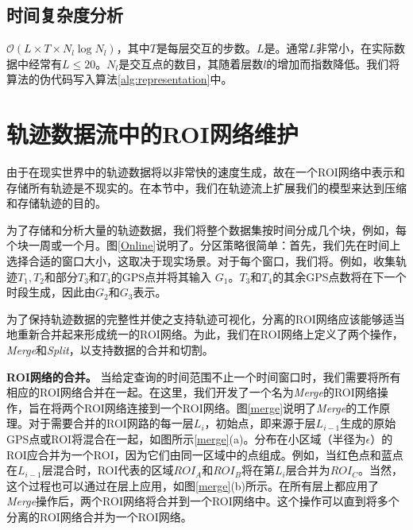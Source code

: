 \subsection{时间复杂度分析}
\label{time_complex}
$\mathcal{O}(L\times T\times N_l\log N_l)$，其中$T$是每层交互的步数。$L$是。通常$L$非常小，在实际数据中经常有$L\leq20$。$N_l$是交互点的数目，其随着层数$l$的增加而指数降低。我们将算法的伪代码写入算法\ref{alg:representation}中。

\section{轨迹数据流中的ROI网络维护}
由于在现实世界中的轨迹数据将以非常快的速度生成，故在一个ROI网络中表示和存储所有轨迹是不现实的。在本节中，我们在轨迹流上扩展我们的模型来达到压缩和存储轨迹的目的。


为了存储和分析大量的轨迹数据，我们将整个数据集按时间分成几个块，例如，每个块一周或一个月。图\ref{Online}说明了。分区策略很简单：首先，我们先在时间上选择合适的窗口大小，这取决于现实场景。对于每个窗口，我们将。例如，收集轨迹$T_1,T_2$和部分$T_3$和$T_4$的GPS点并将其输入 $G_1$。$T_3$和$T_4$的其余GPS点数将在下一个时段生成，因此由$G_2$和$G_3$表示。

为了保持轨迹数据的完整性并使之支持轨迹可视化，分离的ROI网络应该能够适当地重新合并起来形成统一的ROI网络。为此，我们在ROI网络上定义了两个操作，\emph{Merge}和\emph{Split}，以支持数据的合并和切割。


\vspace{3mm}
\noindent\textbf{ROI网络的合并。}
当给定查询的时间范围不止一个时间窗口时，我们需要将所有相应的ROI网络合并在一起。在这里，我们开发了一个名为\emph{Merge}的ROI网络操作，旨在将两个ROI网络连接到一个ROI网络。图\ref{merge}说明了\emph{Merge}的工作原理。对于需要合并的ROI网路的每一层$L_i$，初始点，即来源于层$L_{i-1}$生成的原始GPS点或ROI将混合在一起，如图所示\ref{merge}(a)。分布在小区域（半径为$\epsilon$）的ROI应合并为一个ROI，因为它们由同一区域中的点组成。例如，当红色点和蓝点在$L_{i-1}$层混合时，ROI代表的区域${ROI}_A$和${ROI}_B$将在第$L_i$层合并为${ROI}_C$。当然，这个过程也可以通过在层上应用，如图\ref{merge}(b)所示。在所有层上都应用了\emph{Merge}操作后，两个ROI网络将合并到一个ROI网络中。这个操作可以直到将多个分离的ROI网络合并为一个ROI网络。

